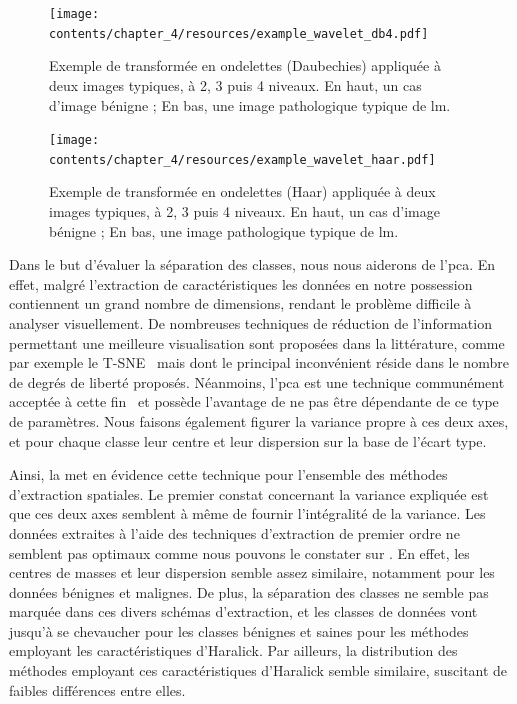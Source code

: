 \begin{figure}[H]
    \centering
    \texttt{[image: contents/chapter\_4/resources/example\_wavelet\_db4.pdf]}
    \caption{Exemple de transformée en ondelettes (Daubechies) appliquée à deux images typiques, à 2, 3 puis 4 niveaux. En haut, un cas d'image bénigne ; En bas, une image pathologique typique de \gls{lm}.}
    \label{fig:example_wavelet_db4}
\end{figure}\par

\begin{figure}[H]
    \centering
    \texttt{[image: contents/chapter\_4/resources/example\_wavelet\_haar.pdf]}
    \caption{Exemple de transformée en ondelettes (Haar) appliquée à deux images typiques, à 2, 3 puis 4 niveaux. En haut, un cas d'image bénigne ; En bas, une image pathologique typique de \gls{lm}.}
    \label{fig:example_wavelet_haar}
\end{figure}\par

Dans le but d'évaluer la séparation des classes, nous nous aiderons de l'\gls{pca}. En effet, malgré l'extraction de caractéristiques les données en notre possession contiennent un grand nombre de dimensions, rendant le problème difficile à analyser visuellement. De nombreuses techniques de réduction de l'information permettant une meilleure visualisation sont proposées dans la littérature, comme par exemple le T-SNE~\cite{Maaten2008} mais dont le principal inconvénient réside dans le nombre de degrés de liberté proposés. Néanmoins, l'\gls{pca} est une technique communément acceptée à cette fin~\cite{Himberg2001} et possède l'avantage de ne pas être dépendante de ce type de paramètres. Nous faisons également figurer la variance propre à ces deux axes, et pour chaque classe leur centre et leur dispersion sur la base de l'écart type.\par

Ainsi, la  met en évidence cette technique pour l'ensemble des méthodes d'extraction spatiales. Le premier constat concernant la variance expliquée est que ces deux axes semblent à même de fournir l'intégralité de la variance. Les données extraites à l'aide des techniques d'extraction de premier ordre ne semblent pas optimaux comme nous pouvons le constater sur . En effet, les centres de masses et leur dispersion semble assez similaire, notamment pour les données bénignes et malignes. De plus, la séparation des classes ne semble pas marquée dans ces divers schémas d'extraction, et les classes de données vont jusqu'à se chevaucher pour les classes bénignes et saines pour les méthodes employant les caractéristiques d'Haralick. Par ailleurs, la distribution des méthodes employant ces caractéristiques d'Haralick semble similaire, suscitant de faibles différences entre elles.\par

